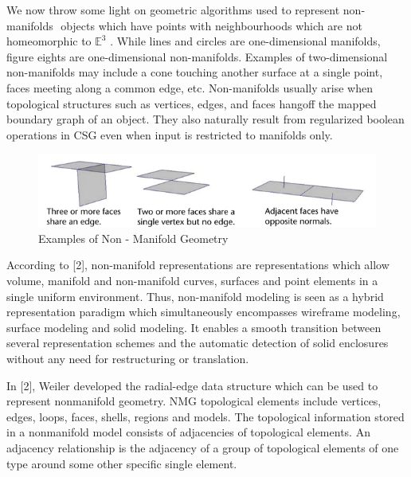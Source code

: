 \hspace{30} We   now   throw   some   light   on   geometric   algorithms   used   to   represent  
non­manifolds   ­   objects   which   have   points   with   neighbourhoods   which   are   not  
homeomorphic   to   $\mathbb{E}^3$ .   While   lines   and   circles   are   one-­dimensional   manifolds,  
figure   eights   are   one­-dimensional   non­-manifolds.   Examples   of   two-­dimensional  
non­-manifolds   may   include   a   cone   touching   another   surface   at   a   single   point,  
faces   meeting   along   a   common   edge,   etc.   Non-­manifolds   usually   arise   when  
topological   structures   such   as   vertices,   edges,   and   faces   hang­off   the   mapped  
boundary   graph   of   an   object.   They   also   naturally   result   from   regularized  
boolean operations in CSG even when input is restricted to manifolds only.  

\begin{figure}[htbp]
\centering
\includegraphics[trim=0.0cm 0.5cm 0.1cm 0.1cm, clip=true, totalheight=0.1\textheight]{Pictures/NMG.png}
\caption[Examples of Non­-Manifold Geometry]{Examples of Non - ­Manifold Geometry}
\label{NMG}
\end{figure}

\hspace{30} According   to   [2],   non­-manifold   representations   are   representations   which  
allow   volume,   manifold   and   non­-manifold   curves,   surfaces   and   point   elements  
in   a   single   uniform   environment.   Thus,   non-­manifold   modeling   is   seen   as   a  
hybrid   representation   paradigm   which   simultaneously   encompasses   wireframe  
modeling,   surface   modeling   and   solid   modeling.   It   enables   a   smooth   transition  
between   several   representation   schemes   and   the   automatic   detection   of   solid  
enclosures without any need for restructuring or translation.  

\hspace{30} In   [2],   Weiler   developed   the   radial-­edge   data   structure   which   can   be  
used   to   represent   non­manifold   geometry.   NMG   topological   elements   include  
vertices,   edges,   loops,   faces,   shells,   regions   and   models.   The   topological  
information   stored   in   a   non­manifold   model   consists   of   adjacencies   of  
topological   elements.   An   adjacency   relationship   is   the   adjacency   of   a   group   of  
topological   elements   of   one   type   around   some   other   specific   single   element.

